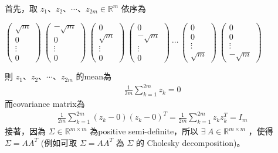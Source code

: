 \documentclass{article}
\begin{document}
\noindent
首先，取 $z_1$、$z_2$、$\cdots$、$z_{2m} \in {\mathbb R}^m$ 依序為\\
\begin{center}
    $\left(
    \begin{array}{c}
        \sqrt{m}\\
        0\\
        \vdots\\
        0
    \end{array}
    \right)\ 
    \left(
    \begin{array}{c}
        -\sqrt{m}\\
        0\\
        \vdots\\
        0
    \end{array}
    \right)\ 
    \left(
    \begin{array}{c}
        0\\
        \sqrt{m}\\
        \vdots\\
        0
    \end{array}
    \right)\ 
    \left(
    \begin{array}{c}
        0\\
        -\sqrt{m}\\
        \vdots\\
        0
    \end{array}
    \right)\ \cdots\ 
    \left(
    \begin{array}{c}
        0\\
        0\\
        \vdots\\
        \sqrt{m}
    \end{array}
    \right)\ 
    \left(
    \begin{array}{c}
        0\\
        0\\
        \vdots\\
        -\sqrt{m}
    \end{array}
    \right)$
\end{center}
則 $z_1$、$z_2$、$\cdots$、$z_{2m}$ 的mean為
\begin{align*}
    \frac{1}{2m} \sum_{k = 1}^{2m} z_k = 0
\end{align*}
而covariance matrix為
\begin{align*}
    \frac{1}{2m} \sum_{k = 1}^{2m} (z_k - 0)(z_k - 0)^T = \frac{1}{2m} \sum_{k = 1}^{2m} z_k z_k^T = I_m
\end{align*}
接著，因為 $\Sigma \in {\mathbb R}^{m \times m}$ 為positive semi-definite，所以 $\exists\ A \in {\mathbb R}^{m \times m}$ ，使得 $\Sigma = A A^T$ (例如可取 $\Sigma = A A^T$ 為 $\Sigma$ 的 Cholesky decomposition)。\\
\end{document}
